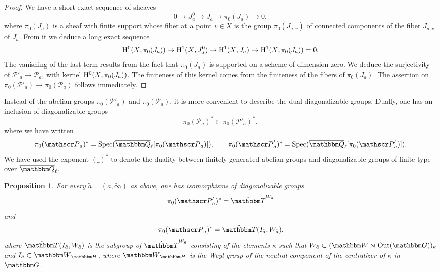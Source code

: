 \documentclass[12pt,english]{smfart}
\numberwithin{equation}{subsection}
\newtheorem{proposition}[equation]{Proposition}
\theoremstyle{remark}
\newcommand\calP{{\mathscr P}}
\newcommand\GG{{\mathbbm G}}
\newcommand\QQ{{\mathbbm Q}}
\newcommand\HH{{\mathbbm H}}
\newcommand\bbW{{\mathbbm W}}
\newcommand\bbT{{\mathbbm T}}
\newcommand\rmH{{\rm H}}
\newcommand\Spec{{\rm Spec}}
\newcommand\Out{{\rm Out}}
\newcommand\Ql{{\overline\QQ_\ell}}
\begin{document}
\begin{proof}
We have a short exact sequence of sheaves
$$0\rightarrow J_a^0\rightarrow J_a\rightarrow \pi_0(J_a)\rightarrow 0,$$
where $\pi_0(J_a)$ is a sheaf with finite support whose fiber at a point $v\in\bar X$ is the group $\pi_0(J_{a,v})$ of connected components of the fiber $J_{a,v}$ of $J_a$. From it we deduce a long exact sequence
$$\rmH^0(\bar X,\pi_0(J_a))\rightarrow \rmH^1(\bar X,J_a^0)\rightarrow \rmH^1(\bar X,J_a)\rightarrow \rmH^1(\bar X,\pi_0(J_a))=0.$$
The vanishing of the last term results from the fact that $\pi_0(J_a)$ is supported on a scheme of dimension zero. We deduce the surjectivity of $\calP'_a\rightarrow\calP_a$, with kernel $\rmH^0(\bar X,\pi_0(J_a))$. The finiteness of this kernel comes from the finiteness of the fibers of $\pi_0(J_a)$. The assertion on $\pi_0(\calP'_a)\rightarrow\pi_0(\calP_a)$ follows immediately.
\end{proof}

Instead of the abelian groups $\pi_0(\calP'_a)$ and $\pi_0(\calP_a)$, it is more convenient to describe the dual diagonalizable groups. Dually, one has an inclusion of diagonalizable groups
$$\pi_0(\calP_a)^*\subset\pi_0(\calP'_a)^*,$$
where we have written
$$\pi_0(\calP_a)^*=\Spec(\Ql[\pi_0(\calP_a)]),\qquad \pi_0(\calP'_a)^*=\Spec(\Ql[\pi_0(\calP'_a)]).$$
We have used the exponent $(\_)^*$ to denote the duality between finitely generated abelian groups and diagonalizable groups of finite type over $\Ql$.

\begin{proposition}\label{pi 0 global}
For every $\tilde a=(a,\tilde\infty)$ as above, one has isomorphisms of diagonalizable groups
$$\pi_0(\calP'_a)^*=\hat\bbT^{W_{\tilde a}}$$
and
$$\pi_0(\calP_a)^*=\hat\bbT(I_{\tilde a},W_{\tilde a}),$$
where $\hat\bbT(I_{\tilde a},W_{\tilde a})$ is the subgroup of $\hat\bbT^{W_{\tilde a}}$ consisting of the elements $\kappa$ such that $W_{\tilde a}\subset(\bbW\rtimes\Out(\GG))_\kappa$ and $I_{\tilde a}\subset\bbW_\HH$, where $\bbW_\HH$ is the Weyl group of the neutral component of the centralizer of $\kappa$ in $\hat\GG$.
\end{proposition}
\end{document}

